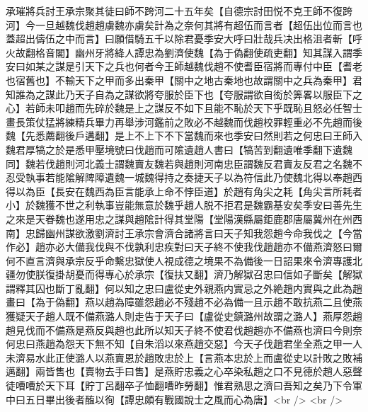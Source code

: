 承璀將兵討王承宗聚其徒曰師不跨河二十五年矣【自德宗討田悦不克王師不復跨河】今一旦越魏伐趙趙虜魏亦虜矣計為之奈何其將有超伍而言者【超伍出位而言也蓋超出儔伍之中而言】曰願借騎五千以除君憂季安大呼曰壯哉兵决出格沮者斬【呼火故翻格音閣】幽州牙將絳人譚忠為劉濟使魏【為于偽翻使疏吏翻】知其謀入謂季安曰如某之謀是引天下之兵也何者今王師越魏伐趙不使耆臣宿將而專付中臣【耆老也宿舊也】不輸天下之甲而多出秦甲【關中之地古秦地也故謂關中之兵為秦甲】君知誰為之謀此乃天子自為之謀欲將夸服於臣下也【夸服謂欲自衒於筭畧以服臣下之心】若師未叩趙而先碎於魏是上之謀反不如下且能不恥於天下乎既恥且怒必任智士畫長策仗猛將練精兵畢力再舉涉河鑑前之敗必不越魏而伐趙校罪輕重必不先趙而後魏【先悉薦翻後戶遘翻】是上不上下不下當魏而來也季安曰然則若之何忠曰王師入魏君厚犒之於是悉甲壓境號曰伐趙而可隂遺趙人書曰【犒苦到翻遺唯季翻下遺魏同】魏若伐趙則河北義士謂魏賣友魏若與趙則河南忠臣謂魏反君賣友反君之名魏不忍受執事若能隂解陴障遺魏一城魏得持之奏捷天子以為符信此乃使魏北得以奉趙西得以為臣【長安在魏西為臣言能承上命不悖臣道】於趙有角尖之耗【角尖言所耗者小】於魏獲不世之利執事豈能無意於魏乎趙人脱不拒君是魏霸基安矣季安曰善先生之來是天眷魏也遂用忠之謀與趙隂計得其堂陽【堂陽漢縣屬鉅鹿郡唐屬冀州在州西南】忠歸幽州謀欲激劉濟討王承宗會濟合諸將言曰天子知我怨趙今命我伐之【今當作必】趙亦必大備我伐與不伐孰利忠疾對曰天子終不使我伐趙趙亦不備燕濟怒曰爾何不直言濟與承宗反乎命繫忠獄使人視成德之境果不為備後一日詔果來令濟專護北疆勿使朕復掛胡憂而得專心於承宗【復扶又翻】濟乃解獄召忠曰信如子斷矣【解獄謂釋其囚也斷丁亂翻】何以知之忠曰盧從史外親燕内實忌之外絶趙内實與之此為趙畫曰【為于偽翻】燕以趙為障雖怨趙必不殘趙不必為備一且示趙不敢抗燕二且使燕獲疑天子趙人既不備燕潞人則走告于天子曰【盧從史鎮潞州故謂之潞人】燕厚怨趙趙見伐而不備燕是燕反與趙也此所以知天子終不使君伐趙趙亦不備燕也濟曰今則奈何忠曰燕趙為怨天下無不知【自朱滔以來燕趙交惡】今天子伐趙君坐全燕之甲一人未濟易水此正使潞人以燕賣恩於趙敗忠於上【言燕本忠於上而盧從史以計敗之敗補邁翻】兩皆售也【賣物去手曰售】是燕貯忠義之心卒染私趙之口不見德於趙人惡聲徒嘈嘈於天下耳【貯丁呂翻卒子恤翻嘈昨勞翻】惟君熟思之濟曰吾知之矣乃下令軍中曰五日畢出後者醢以徇【譚忠頗有戰國說士之風而心為唐】<br />
<br />
